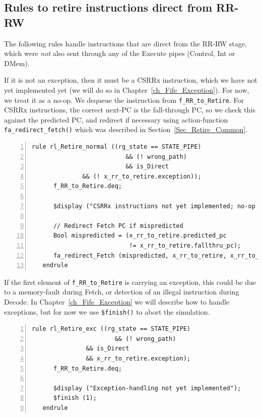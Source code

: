 
\subsection{Rules to retire instructions direct from RR-RW}

The following rules handle instructions that are direct from the RR-RW
stage, {\ie} which were \emph{not} also sent through any of the
Execute pipes (Control, Int or DMem).

If it is not an exception, then it must be a CSRRx instruction, which
we have not yet implemented yet (we will do so in
Chapter~\ref{ch_Fife_Exception}).  For now, we treat it as a no-op.  We
dequeue the instruction from \verb|f_RR_to_Retire|.  For CSRRx
instructions, the correct next-PC is the fall-through PC, so we check
this against the predicted PC, and redirect if necessary using
action-function \verb|fa_redirect_fetch()| which was described in
Section~\ref{Sec_Retire_Common}.

{\small
\begin{Verbatim}[frame=single, numbers=left, label=(In file:src\_Fife/S5\_Retire.bsv)]
   rule rl_Retire_normal ((rg_state == STATE_PIPE)
                          && (! wrong_path)
                          && is_Direct
			  && (! x_rr_to_retire.exception));
      f_RR_to_Retire.deq;

      $display ("CSRRx instructions not yet implemented; no-op for now");

      // Redirect Fetch PC if mispredicted
      Bool mispredicted = (x_rr_to_retire.predicted_pc
                           != x_rr_to_retire.fallthru_pc);
      fa_redirect_Fetch (mispredicted, x_rr_to_retire, x_rr_to_retire.fallthru_pc);
   endrule
\end{Verbatim}
}

If the first element of \verb|f_RR_to_Retire| is carrying an
exception, this could be due to a memory-fault during Fetch, or
detection of an illegal instruction during Decode.  In
Chapter~\ref{ch_Fife_Exception} we will describe how to handle
exceptions, but for now we use \verb|$finish()| to abort the
simulation.

{\small
\begin{Verbatim}[frame=single, numbers=left, label=(In file:src\_Fife/S5\_Retire.bsv)]
   rule rl_Retire_exc ((rg_state == STATE_PIPE)
                       && (! wrong_path)
		       && is_Direct
		       && x_rr_to_retire.exception);
      f_RR_to_Retire.deq;

      $display ("Exception-handling not yet implemented");
      $finish (1);
   endrule
\end{Verbatim}
}


